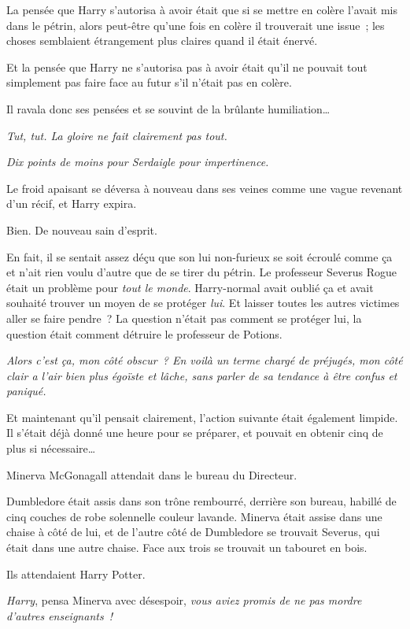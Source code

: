 La pensée que Harry s'autorisa à avoir était que si se mettre en colère l'avait mis dans le pétrin, alors peut-être qu'une fois en colère il trouverait une issue~; les choses semblaient étrangement plus claires quand il était énervé.

Et la pensée que Harry ne s'autorisa pas à avoir était qu'il ne pouvait tout simplement pas faire face au futur s'il n'était pas en colère.

Il ravala donc ses pensées et se souvint de la brûlante humiliation…

\emph{Tut, tut.
La gloire ne fait clairement pas tout.}

\emph{Dix points de moins pour Serdaigle pour impertinence.}

Le froid apaisant se déversa à nouveau dans ses veines comme une vague revenant d'un récif, et Harry expira.

Bien. De nouveau sain d'esprit.

En fait, il se sentait assez déçu que son lui non-furieux se soit écroulé comme ça et n'ait rien voulu d'autre que de se tirer du pétrin.
Le professeur Severus Rogue était un problème pour \emph{tout le monde}.
Harry-normal avait oublié ça et avait souhaité trouver un moyen de se protéger \emph{lui}.
Et laisser toutes les autres victimes aller se faire pendre~?
La question n'était pas comment se protéger lui, la question était comment détruire le professeur de Potions.

\emph{Alors c'est ça, mon côté obscur~?
En voilà un terme chargé de préjugés, mon côté clair a l'air bien plus égoïste et lâche, sans parler de sa tendance à être confus et paniqué.}

Et maintenant qu'il pensait clairement, l'action suivante était également limpide.
Il s'était déjà donné une heure pour se préparer, et pouvait en obtenir cinq de plus si nécessaire…

\later

Minerva McGonagall attendait dans le bureau du Directeur.

Dumbledore était assis dans son trône rembourré, derrière son bureau, habillé de cinq couches de robe solennelle couleur lavande.
Minerva était assise dans une chaise à côté de lui, et de l'autre côté de Dumbledore se trouvait Severus, qui était dans une autre chaise.
Face aux trois se trouvait un tabouret en bois.

Ils attendaient Harry Potter.

\emph{Harry}, pensa Minerva avec désespoir, \emph{vous aviez promis de ne pas mordre d'autres enseignants~!}

